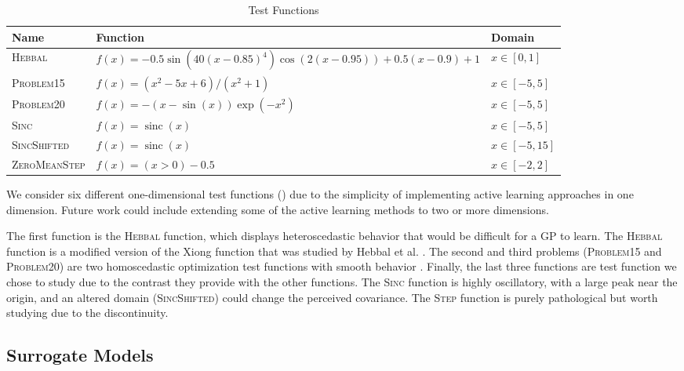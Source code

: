 \documentclass[conference,final]{IEEEtran}
\DeclareMathOperator{\sinc}{sinc}
\begin{document}
	\begin{table*}[htbp]
    \renewcommand{\arraystretch}{2.0}
    \centering
    \caption{Test Functions}
    \label{tab:test_fns}
        \begin{tabular}{lll}
        \toprule 
        \bfseries Name & \bfseries Function & \bfseries Domain \\ \midrule
	    \textsc{Hebbal} & $f(x) = -0.5 \sin\left(40 (x-0.85)^4\right) \cos(2(x-0.95)) + 0.5(x-0.9) + 1$ & $x \in [0, 1]$ \\
	    \textsc{Problem15} & $f(x) = (x^2 - 5x + 6) / (x^2 + 1) $ & $x \in [-5, 5]$ \\
	    \textsc{Problem20} & $f(x) = -(x - \sin(x))\exp(-x^2) $ & $x \in [-5, 5]$ \\
	    \textsc{Sinc} & $f(x) = \sinc(x) $ & $x \in [-5, 5]$ \\
	    \textsc{SincShifted} & $f(x) = \sinc(x) $ & $x \in [-5, 15]$ \\
	    \textsc{ZeroMeanStep} & $f(x) = (x > 0) - 0.5 $ & $x \in [-2, 2]$ \\
	    \bottomrule
	    \end{tabular}
	\end{table*}
	
	We consider six different one-dimensional test functions () due to the simplicity of implementing active learning approaches in one dimension. Future work could include extending some of the active learning methods to two or more dimensions.
	
	The first function is the \textsc{Hebbal} function, which displays heteroscedastic behavior that would be difficult for a GP to learn. The \textsc{Hebbal} function is a modified version of the Xiong function that was studied by Hebbal et al. \cite{hebbal2019bayesian}. The second and third problems (\textsc{Problem15} and \textsc{Problem20}) are two homoscedastic optimization test functions with smooth behavior \cite{1-DFunctions}. Finally, the last three functions are test function we chose to study due to the contrast they provide with the other functions. The \textsc{Sinc} function is highly oscillatory, with a large peak near the origin, and an altered domain (\textsc{SincShifted}) could change the perceived covariance. The \textsc{Step} function is purely pathological but worth studying due to the discontinuity. 
	
	\subsection{Surrogate Models}
	
\end{document}
